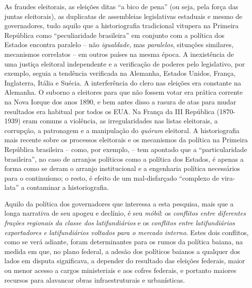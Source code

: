 As fraudes eleitorais, as eleições ditas ``a bico de pena'' (ou seja, pela força das juntas eleitorais), as duplicatas de assembleias legislativas estaduais e mesmo de governadores, tudo aquilo que a historiografia tradicional vitupera na Primeira República como ``peculiaridade brasileira'' em conjunto com a política dos Estados encontra paralelo -- não \textit{igualdade}, mas \textit{paralelos}, situações similares, mecanismos correlatos -- em outros países na mesma época. A inexistência de uma justiça eleitoral independente e a verificação de poderes pelo legislativo, por exemplo, seguia a tendência verificada na Alemanha, Estados Unidos, França, Inglaterra, Itália e Suécia. A interferência do clero nas eleições era constante na Alemanha. O suborno a eleitores para que não fossem votar era prática corrente na Nova Iorque dos anos 1890, e bem antes disso a rasura de atas para mudar resultados era habitual por todos os EUA. Na França da III República (1870-1939) eram comuns a violência, as irregularidades nas listas eleitorais, a corrupção, a patronagem e a manipulação do \textit{quórum} eleitoral. A historiografia mais recente sobre os processos eleitorais e os mecanismos da política na Primeira República brasileira -- como, por exemplo,  -- tem apontado que a ``particularidade brasileira'', no caso de arranjos políticos como a política dos Estados, é apenas a forma como se deram o arranjo institucional e a engenharia política necessários para o continuísmo; o resto, é efeito de um mal-disfarçado ``complexo de vira-lata'' \cite{rodrigues_viralatas_1993} a contaminar a historiografia.

Aquilo da política dos governadores que interessa a esta pesquisa, mais que a longa narrativa de seu apogeu e declínio, é seu \textit{móbil}: os \textit{conflitos entre diferentes frações regionais da classe dos latifundiários} e os \textit{conflitos entre latifundiários exportadores e latifundiários voltados para o mercado interno}. Estes dois conflitos, como se verá adiante, foram determinantes para os rumos da política baiana, na medida em que, no plano federal, a adesão dos políticos baianos a qualquer dos lados em disputa significava, a depender do resultado das eleições federais, maior ou menor acesso a cargos ministeriais e aos cofres federais, e portanto maiores recursos para alavancar obras infraestruturais e urbanísticas.

